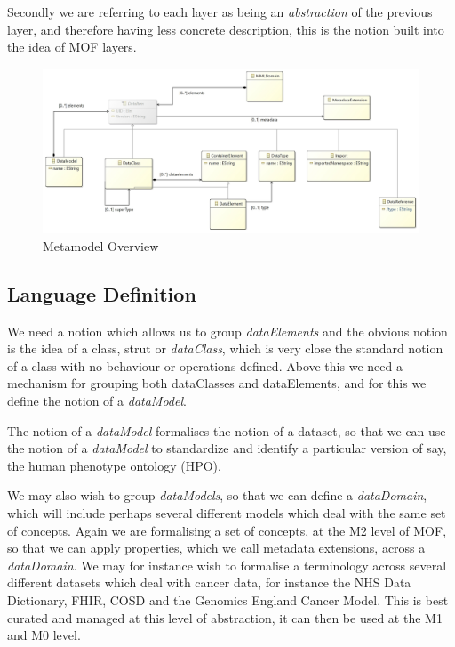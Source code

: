 \documentclass{llncs}
\begin{document}
	Secondly we are referring to each layer as being an \emph{abstraction} of the previous layer, and therefore having less concrete description, this is the notion built into the idea of MOF layers. 
	
	\begin{figure}
		\centering
		\includegraphics[scale=0.11]{figures/MMLDiagram}
		\caption{Metamodel Overview}
		\label{fig:mmoverview}
	\end{figure}
	
	
	
	\subsection{Language Definition}
	
	We need a notion which allows us to group \emph{dataElements} and the obvious notion is the idea of a class, strut or \emph{dataClass}, which is very close the standard notion of a class with no behaviour or operations defined. Above this we need a mechanism for grouping both dataClasses and dataElements, and for this we define the notion of a \emph{dataModel}. 
	
	The notion of a \emph{dataModel} formalises the notion of a dataset, so that we can use the notion of a \emph{dataModel} to standardize and identify a particular version of say, the human phenotype ontology (HPO). 
	
	We may also wish to group \emph{dataModels}, so that we can define a \emph{dataDomain}, which will include perhaps several different models which deal with the same set of concepts. Again we are formalising a set of concepts, at the M2 level of MOF, so that we can apply properties, which we call metadata extensions, across a \emph{dataDomain}. We may for instance wish to formalise a terminology across several different datasets which deal with cancer data, for instance the NHS Data Dictionary, FHIR, COSD and the Genomics England Cancer Model. This is best curated and managed at this level of abstraction, it can then be used at the M1 and M0 level. 
	
\end{document}
